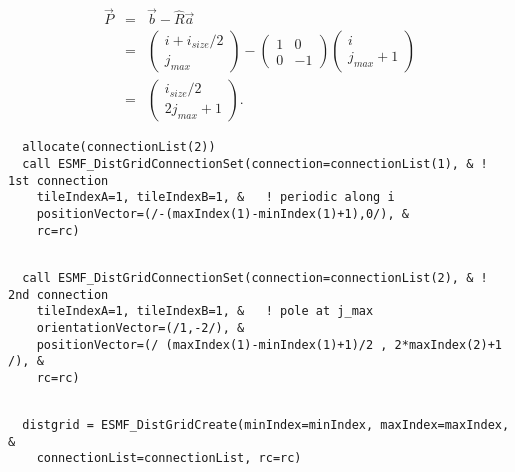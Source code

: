    \begin{eqnarray}
   \vec P & = & \vec b - \hat R \vec a \nonumber \\
          & = & \left( \begin{array}{l}
      i + i_{size}/2\\
      j_{max} \end{array} \right)
   - \left( \begin{array}{rr}
   1 & 0 \\
   0 & -1 \end{array} \right)
   \left( \begin{array}{l}
      i \\
      j_{max}+1 \end{array} \right) \nonumber \\
          & = & \left( \begin{array}{l}
      i_{size}/2\\
      2j_{max} +1 \end{array} \right).
   \end{eqnarray} 

 \begin{verbatim}
  allocate(connectionList(2))
  call ESMF_DistGridConnectionSet(connection=connectionList(1), & ! 1st connection
    tileIndexA=1, tileIndexB=1, &   ! periodic along i
    positionVector=(/-(maxIndex(1)-minIndex(1)+1),0/), & 
    rc=rc) 
 
\end{verbatim}
 

 \begin{verbatim}
  call ESMF_DistGridConnectionSet(connection=connectionList(2), & ! 2nd connection
    tileIndexA=1, tileIndexB=1, &   ! pole at j_max
    orientationVector=(/1,-2/), &
    positionVector=(/ (maxIndex(1)-minIndex(1)+1)/2 , 2*maxIndex(2)+1 /), & 
    rc=rc)
 
\end{verbatim}
 

 \begin{verbatim}
  distgrid = ESMF_DistGridCreate(minIndex=minIndex, maxIndex=maxIndex, &
    connectionList=connectionList, rc=rc)
 
\end{verbatim}
 

